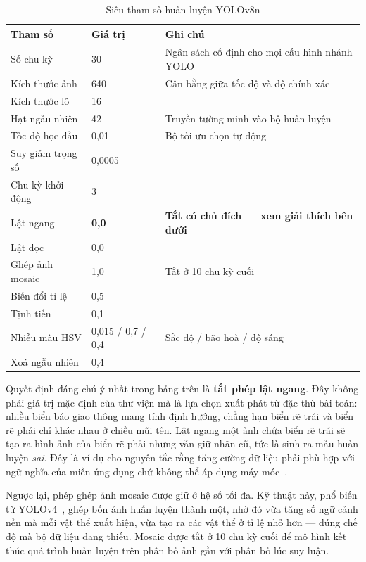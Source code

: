\begin{table}[H]
\centering
\caption{Siêu tham số huấn luyện YOLOv8n}
\label{tab:yolo_cfg}
\small
\begin{tabular}{lll}
\toprule
\textbf{Tham số} & \textbf{Giá trị} & \textbf{Ghi chú} \\
\midrule
Số chu kỳ        & 30      & Ngân sách cố định cho mọi cấu hình nhánh YOLO \\
Kích thước ảnh   & 640     & Cân bằng giữa tốc độ và độ chính xác \\
Kích thước lô    & 16      & \\
Hạt ngẫu nhiên   & 42      & Truyền tường minh vào bộ huấn luyện \\
Tốc độ học đầu   & 0,01    & Bộ tối ưu chọn tự động \\
Suy giảm trọng số& 0,0005  & \\
Chu kỳ khởi động & 3       & \\
Lật ngang        & \textbf{0,0} & \textbf{Tắt có chủ đích --- xem giải thích bên dưới} \\
Lật dọc          & 0,0     & \\
Ghép ảnh mosaic  & 1,0     & Tắt ở 10 chu kỳ cuối \\
Biến đổi tỉ lệ   & 0,5     & \\
Tịnh tiến        & 0,1     & \\
Nhiễu màu HSV    & 0,015 / 0,7 / 0,4 & Sắc độ / bão hoà / độ sáng \\
Xoá ngẫu nhiên   & 0,4     & \\
\bottomrule
\end{tabular}
\end{table}

Quyết định đáng chú ý nhất trong bảng trên là \textbf{tắt phép lật ngang}. Đây không phải giá trị
mặc định của thư viện mà là lựa chọn xuất phát từ đặc thù bài toán: nhiều biển báo giao thông mang
tính định hướng, chẳng hạn biển rẽ trái và biển rẽ phải chỉ khác nhau ở chiều mũi tên. Lật ngang
một ảnh chứa biển rẽ trái sẽ tạo ra hình ảnh của biển rẽ phải nhưng vẫn giữ nhãn cũ, tức là sinh
ra mẫu huấn luyện \emph{sai}. Đây là ví dụ cho nguyên tắc rằng tăng cường dữ liệu phải phù hợp với
ngữ nghĩa của miền ứng dụng chứ không thể áp dụng máy móc~\cite{shorten2019augmentation}.

Ngược lại, phép ghép ảnh mosaic được giữ ở hệ số tối đa. Kỹ thuật này, phổ biến từ
YOLOv4~\cite{bochkovskiy2020yolov4}, ghép bốn ảnh huấn luyện thành một, nhờ đó vừa tăng số ngữ
cảnh nền mà mỗi vật thể xuất hiện, vừa tạo ra các vật thể ở tỉ lệ nhỏ hơn --- đúng chế độ mà bộ dữ
liệu đang thiếu. Mosaic được tắt ở 10 chu kỳ cuối để mô hình kết thúc quá trình huấn luyện trên
phân bố ảnh gần với phân bố lúc suy luận.

